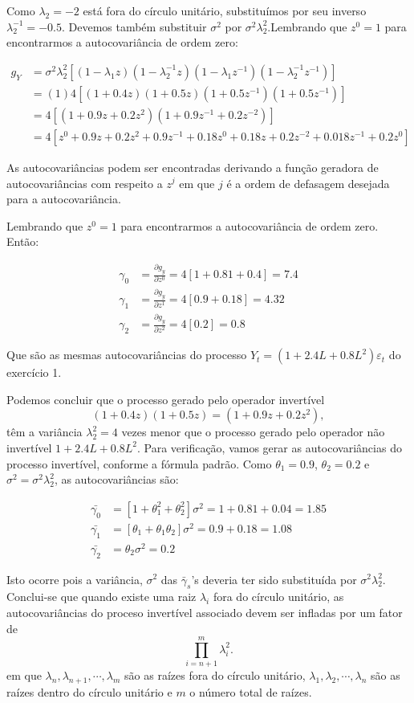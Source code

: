\begin{enumerate}
				Como $\lambda_2=-2$ está fora do círculo unitário, substituímos por seu inverso $\lambda_2^{-1}=-0.5$. Devemos também substituir $\sigma^2$ por $\sigma^2\lambda_2^2$.Lembrando que $z^0=1$ para encontrarmos a autocovariância de ordem zero:
				
				\begin{align*}
					g_Y&=\sigma^2\lambda_2^2[(1-\lambda_1z)(1-\lambda_2^{-1}z)(1-\lambda_1z^{-1})(1-\lambda_2^{-1}z^{-1})]\\
					&=(1)4[(1+0.4z)(1+0.5z)(1+0.5z^{-1})(1+0.5z^{-1})]\\
					&=4[(1+0.9z+0.2z^2)(1+0.9z^{-1}+0.2z^{-2})]\\
					&=4[z^0+0.9z+0.2z^2+0.9z^{-1}+0.18z^0+0.18z+0.2z^{-2}+0.018z^{-1}+0.2z^0]
				\end{align*}
				
				As autocovariâncias podem ser encontradas derivando a função geradora de autocovariâncias com respeito a $z^j$ em que $j$ é a ordem de defasagem desejada para a autocovariância.
				
				Lembrando que $z^0=1$ para encontrarmos a autocovariância de ordem zero. Então:
				
				\begin{align*}
					\gamma_0&=\frac{\partial g_y}{\partial z^0}	= 4[1+0.81+0.4]=7.4\\
					\gamma_1&=\frac{\partial g_y}{\partial z^1} = 4[0.9+0.18]=4.32\\
					\gamma_2&=\frac{\partial g_y}{\partial z^2} = 4[0.2]=0.8
				\end{align*}
			
		Que são as mesmas autocovariâncias do processo $Y_t=(1+2.4L+0.8L^2)\varepsilon_t$ do exercício 1.
					
					
				
	Podemos concluir que o processo gerado pelo operador invertível $$(1+0.4z)(1+0.5z)=(1+0.9z+0.2z^2),$$ têm a variância $\lambda_2^2=4$ vezes menor que o processo gerado pelo operador não invertível $1+2.4L+0.8L^2$. Para verificação, vamos gerar as autocovariâncias do processo invertível, conforme a fórmula padrão. Como $\theta_1=0.9$, $\theta_2=0.2$ e $\sigma^2=\sigma^2\lambda_2^2$, as autocovariâncias são:
	
	\begin{align*}
		\bar{\gamma_0}&=[1+\theta_1^2+\theta_2^2]\sigma^2=1+0.81+0.04=1.85\\
		\bar{\gamma_1}&=[\theta_1+\theta_1\theta_2]\sigma^2=0.9+0.18=1.08\\
		\bar{\gamma_2}&=\theta_2\sigma^2=0.2
	\end{align*}

	Isto ocorre pois a variância, $\sigma^2$ das $\bar{\gamma}_s$'s deveria ter sido substituída por $\sigma^2\lambda^2_2$. Conclui-se que quando existe uma raiz $\lambda_i$ fora do círculo unitário, as autocovariâncias do proceso invertível associado devem ser infladas por um fator de $$\prod\limits_{i=n+1}^{m}\lambda_i^2.$$ em que $\lambda_n, \lambda_{n+1},\cdots, \lambda_m$ são as raízes fora do círculo unitário, $\lambda_1, \lambda_{2},\cdots, \lambda_n$ são as raízes dentro do círculo unitário e $m$ o número total de raízes.

\end{enumerate}